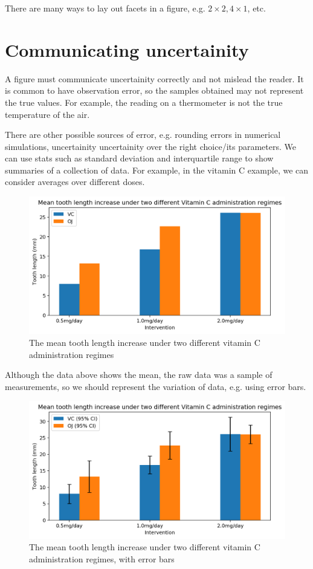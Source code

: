 \documentclass[a4paper, openany]{memoir}
\begin{document}
There are many ways to lay out facets in a figure, e.g. $2 \times 2, 4 \times 1$, etc.
\newpage

\section{Communicating uncertainity}
A figure must communicate uncertainity correctly and not mislead the reader. It is common to have observation error, so the samples obtained may not represent the true values. For example, the reading on a thermometer is not the true temperature of the air.

There are other possible sources of error, e.g. rounding errors in numerical simulations, uncertainity uncertainity over the right choice/its parameters. We can use stats such as standard deviation and interquartile range to show summaries of a collection of data. For example, in the vitamin C example, we can consider averages over different doses.
\begin{figure}[H]
    \centering
    \includegraphics[scale=0.6]{src/2.63 tooth length example I.png}
    \caption{The mean tooth length increase under two different vitamin C administration regimes}
\end{figure}
\noindent Although the data above shows the mean, the raw data was a sample of measurements, so we should represent the variation of data, e.g. using error bars.
\begin{figure}[H]
    \centering
    \includegraphics[scale=0.6]{src/2.64 tooth length example II.png}
    \caption{The mean tooth length increase under two different vitamin C administration regimes, with error bars}
\end{figure}
\end{document}
